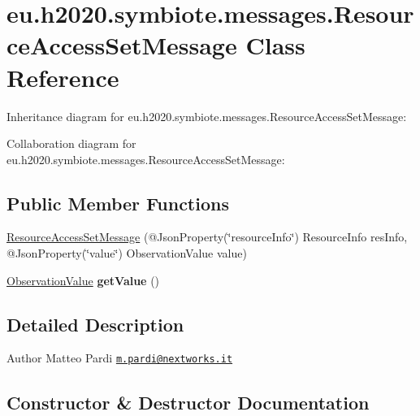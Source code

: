 \hypertarget{classeu_1_1h2020_1_1symbiote_1_1messages_1_1ResourceAccessSetMessage}{}\section{eu.\+h2020.\+symbiote.\+messages.\+Resource\+Access\+Set\+Message Class Reference}
\label{classeu_1_1h2020_1_1symbiote_1_1messages_1_1ResourceAccessSetMessage}


Inheritance diagram for eu.\+h2020.\+symbiote.\+messages.\+Resource\+Access\+Set\+Message\+:


Collaboration diagram for eu.\+h2020.\+symbiote.\+messages.\+Resource\+Access\+Set\+Message\+:
\subsection*{Public Member Functions}
\begin{DoxyCompactItemize}
\item 
\hyperlink{classeu_1_1h2020_1_1symbiote_1_1messages_1_1ResourceAccessSetMessage_ab52f50143d24fae8bfd93358f5ffe585}{Resource\+Access\+Set\+Message} (@Json\+Property(\char`\"{}resource\+Info\char`\"{}) Resource\+Info res\+Info, @Json\+Property(\char`\"{}value\char`\"{}) Observation\+Value value)
\item 
\mbox{\label{classeu_1_1h2020_1_1symbiote_1_1messages_1_1ResourceAccessSetMessage_a3bd1ead4f779d0e3cb0b883d3ae2af44}} 
\hyperlink{classeu_1_1h2020_1_1symbiote_1_1model_1_1data_1_1ObservationValue}{Observation\+Value} {\bfseries get\+Value} ()
\end{DoxyCompactItemize}


\subsection{Detailed Description}
\begin{DoxyAuthor}{Author}
Matteo Pardi \href{mailto:m.pardi@nextworks.it}{\tt m.\+pardi@nextworks.\+it} 
\end{DoxyAuthor}


\subsection{Constructor \& Destructor Documentation}
\mbox{\label{classeu_1_1h2020_1_1symbiote_1_1messages_1_1ResourceAccessSetMessage_ab52f50143d24fae8bfd93358f5ffe585}} 

